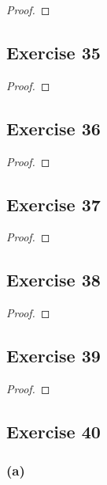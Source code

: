 \documentclass[14pt]{extarticle}
\begin{document}
\begin{proof}

\end{proof}

\subsection{Exercise 35}

\begin{proof}

\end{proof}

\subsection{Exercise 36}

\begin{proof}

\end{proof}

\subsection{Exercise 37}

\begin{proof}

\end{proof}

\subsection{Exercise 38}

\begin{proof}

\end{proof}

\subsection{Exercise 39}

\begin{proof}

\end{proof}

\subsection{Exercise 40}

\subsubsection{(a)}
\end{document}
